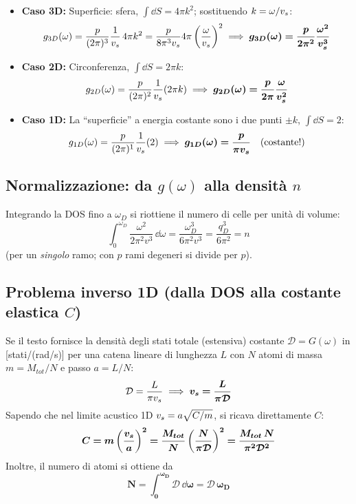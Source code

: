 \begin{itemize}
    \item \textbf{Caso 3D:} Superficie: sfera, $\int \dd S = 4\pi k^2$; sostituendo $k=\omega/v_s$:
\[ g_{3D}(\omega) = \frac{p}{(2\pi)^3}\frac{1}{v_s}\,4\pi k^2 = \frac{p}{8\pi^3 v_s}4\pi\left(\frac{\omega}{v_s}\right)^2
   \implies \bm{g_{3D}(\omega) = \frac{p}{2\pi^2}\frac{\omega^2}{v_s^3}} \]
\item \textbf{Caso 2D:} Circonferenza, $\int\dd S = 2\pi k$:
\[ g_{2D}(\omega) = \frac{p}{(2\pi)^2}\frac{1}{v_s}(2\pi k)
   \implies \bm{g_{2D}(\omega) = \frac{p}{2\pi}\frac{\omega}{v_s^2}} \]
\item \textbf{Caso 1D:} La ``superficie'' a energia costante sono i due punti $\pm k$, $\int\dd S = 2$:
\[ g_{1D}(\omega) = \frac{p}{(2\pi)^1}\frac{1}{v_s}(2) \implies \bm{g_{1D}(\omega) = \frac{p}{\pi v_s}} \quad(\text{costante!}) \]
\end{itemize}

\subsection{Normalizzazione: da $g(\omega)$ alla densità $n$}
Integrando la DOS fino a $\omega_D$ si riottiene il numero di celle per unità di volume:
\[ \int_0^{\omega_D} \frac{\omega^2}{2\pi^2 v^3}\,\dd\omega = \frac{\omega_D^3}{6\pi^2 v^3} = \frac{q_D^3}{6\pi^2} = n \]
(per un \emph{singolo} ramo; con $p$ rami degeneri si divide per $p$).

\subsection{Problema inverso 1D (dalla DOS alla costante elastica $C$)}
Se il testo fornisce la densità degli stati totale (estensiva) costante $\mathcal{D} = G(\omega)$ in [stati/(rad/s)] per una catena lineare di lunghezza $L$ con $N$ atomi di massa $m = M_{tot}/N$ e passo $a = L/N$:
\[ \mathcal{D} = \frac{L}{\pi v_s} \implies \bm{v_s = \frac{L}{\pi \mathcal{D}}} \]
Sapendo che nel limite acustico 1D $v_s = a\sqrt{C/m}$, si ricava direttamente $C$:
\[ \bm{C = m \left( \frac{v_s}{a} \right)^2 = \frac{M_{tot}}{N} \left( \frac{N}{\pi \mathcal{D}} \right)^2 = \frac{M_{tot}\,N}{\pi^2 \mathcal{D}^2}} \]
Inoltre, il numero di atomi si ottiene da \[ \bm{N = \int_0^{\omega_D}\mathcal{D}\,\dd\omega = \mathcal{D}\,\omega_D}\]

